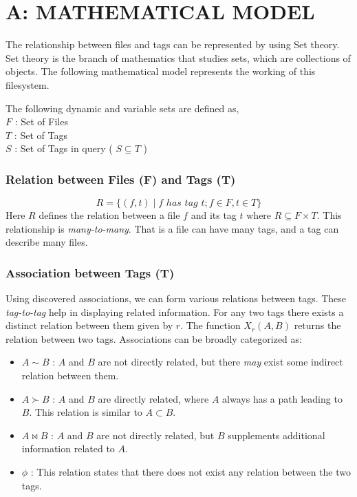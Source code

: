 \begingroup
\let\clearpage\relax
{}
{}%
\chapter*{A: MATHEMATICAL MODEL}
\endgroup
The relationship between files and tags can be represented by using Set theory. Set theory is the branch of mathematics that studies sets, which are collections of objects. The following mathematical model represents the working of this filesystem. 

\noindent The following dynamic and variable sets are defined as, \\
\indent $F$	: Set of Files \\
\indent $T$	: Set of Tags \\
\indent $S$	: Set of Tags in query ( $S \subseteq T$ ) \\

\subsection{Relation between Files (F) and Tags (T)}
$$ R = \{(f,t) \mid f \,\, has \,\, tag \,\,t; f \in F, t \in T\}$$
Here $R$ defines the relation between a file $f$ and its tag $t$ where $R \subseteq F \times T$. This relationship is \emph{many-to-many}. 
That is a file can have many tags, and a tag can describe many files.

\subsection{Association between Tags (T)}
Using discovered associations, we can form various relations between tags. These \emph{tag-to-tag} help in displaying related information. For any two tags there exists a distinct relation between them given by $r$. The function $X_{r}(A,B)$ returns the relation between two tags. Associations can be broadly categorized as:
\begin{itemize}
\item {$A \sim B$} : $A$ and $B$ are not directly related, but there \emph{may} exist some indirect relation between them.
\item $A \succ B$ : $A$ and $B$ are directly related, where $A$ always has a path leading to $B$. This relation is similar to $A \subset B$.
\item $A \bowtie B$ : $A$ and $B$ are not directly related, but $B$ supplements additional information related to $A$.
\item $\phi$ : This relation states that there does not exist any relation between the two tags.
\end{itemize}

